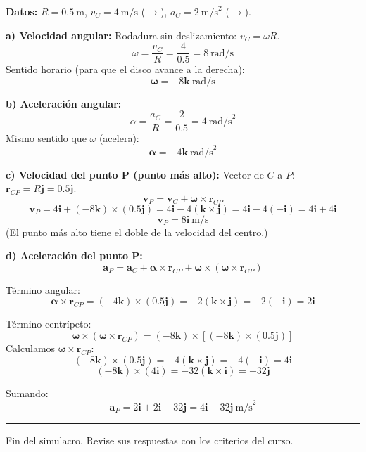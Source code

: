 \documentclass[12pt,a4paper]{article}
\begin{document}
\begin{solbox}
\textbf{Datos:} $R = 0.5\ \text{m}$, $v_C = 4\ \text{m/s}$ ($\rightarrow$),
$a_C = 2\ \text{m/s}^2$ ($\rightarrow$).

\textbf{a) Velocidad angular:}
Rodadura sin deslizamiento: $v_C = \omega R$.
\[
\omega = \frac{v_C}{R} = \frac{4}{0.5} = 8\ \text{rad/s}
\]
Sentido horario (para que el disco avance a la derecha):
\[
\boxed{\boldsymbol{\omega} = -8\mathbf{k}\ \text{rad/s}}
\]

\textbf{b) Aceleración angular:}
\[
\alpha = \frac{a_C}{R} = \frac{2}{0.5} = 4\ \text{rad/s}^2
\]
Mismo sentido que $\omega$ (acelera):
\[
\boxed{\boldsymbol{\alpha} = -4\mathbf{k}\ \text{rad/s}^2}
\]

\textbf{c) Velocidad del punto P (punto más alto):}
Vector de $C$ a $P$: $\mathbf{r}_{CP} = R\mathbf{j} = 0.5\mathbf{j}$.
\[
\mathbf{v}_P = \mathbf{v}_C + \boldsymbol{\omega} \times \mathbf{r}_{CP}
\]
\[
\mathbf{v}_P = 4\mathbf{i} + (-8\mathbf{k}) \times (0.5\mathbf{j})
= 4\mathbf{i} - 4(\mathbf{k}\times\mathbf{j})
= 4\mathbf{i} - 4(-\mathbf{i})
= 4\mathbf{i} + 4\mathbf{i}
\]
\[
\boxed{\mathbf{v}_P = 8\mathbf{i}\ \text{m/s}}
\]
(El punto más alto tiene el doble de la velocidad del centro.)

\textbf{d) Aceleración del punto P:}
\[
\mathbf{a}_P = \mathbf{a}_C + \boldsymbol{\alpha} \times \mathbf{r}_{CP}
             + \boldsymbol{\omega} \times (\boldsymbol{\omega} \times \mathbf{r}_{CP})
\]

Término angular:
\[
\boldsymbol{\alpha} \times \mathbf{r}_{CP} = (-4\mathbf{k}) \times (0.5\mathbf{j})
= -2(\mathbf{k}\times\mathbf{j}) = -2(-\mathbf{i}) = 2\mathbf{i}
\]

Término centrípeto:
\[
\boldsymbol{\omega} \times (\boldsymbol{\omega} \times \mathbf{r}_{CP})
= (-8\mathbf{k}) \times [(-8\mathbf{k}) \times (0.5\mathbf{j})]
\]
Calculamos $\boldsymbol{\omega} \times \mathbf{r}_{CP}$:
\[
(-8\mathbf{k}) \times (0.5\mathbf{j}) = -4(\mathbf{k}\times\mathbf{j}) = -4(-\mathbf{i}) = 4\mathbf{i}
\]
\[
(-8\mathbf{k}) \times (4\mathbf{i}) = -32(\mathbf{k}\times\mathbf{i}) = -32\mathbf{j}
\]

Sumando:
\[
\mathbf{a}_P = 2\mathbf{i} + 2\mathbf{i} - 32\mathbf{j}
= \boxed{4\mathbf{i} - 32\mathbf{j}\ \text{m/s}^2}
\]
\end{solbox}

\vfill

\begin{center}
\rule{0.5\textwidth}{0.5pt}
\small Fin del simulacro. Revise sus respuestas con los criterios del curso.
\end{center}
\end{document}
